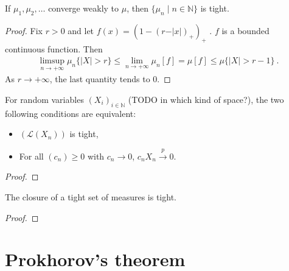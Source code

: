 \begin{lemma}\label{lem:tight_of_cvg}
If $\mu_1, \mu_2, \ldots$ converge weakly to $\mu$, then $\{\mu_n \mid n \in \mathbb{N}\}$ is tight.
\end{lemma}

\begin{proof}
Fix $r > 0$ and let $f(x) = (1 - (r - \vert x \vert)_+)_+$ . $f$ is a bounded continuous function. Then
\begin{align*}
\limsup_{n \to +\infty} \mu_n\{\vert X \vert > r\}
\le \lim_{n \to +\infty} \mu_n\left[ f \right]
= \mu[f]
\le \mu\{\vert X \vert > r - 1\} \: .
\end{align*}
As $r \to +\infty$, the last quantity tends to 0.
\end{proof}


\begin{lemma}\label{tight_iff_cvg_probability}
For random variables $(X_i)_{i \in \mathbb{N}}$ (TODO in which kind of space?), the two following conditions are equivalent:
\begin{itemize}
	\item $(\mathcal L(X_n))$ is tight,
	\item For all $(c_n) \ge 0$ with $c_n \to 0$, $c_n X_n \xrightarrow{p} 0$.
\end{itemize}
\end{lemma}

\begin{proof}

\end{proof}


\begin{lemma}\label{tight_closure}
The closure of a tight set of measures is tight.
\end{lemma}

\begin{proof}
\end{proof}



\section{Prokhorov's theorem}


